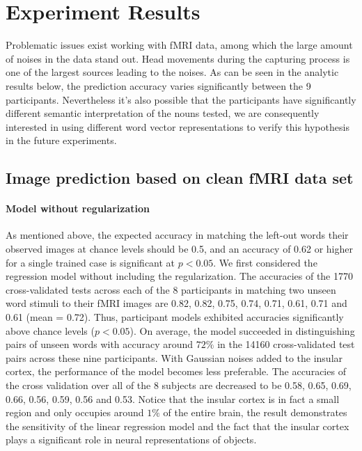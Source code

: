 \documentclass{article}
\begin{document}
\section{Experiment Results}
Problematic issues exist working with fMRI data, among which the large amount of noises in the data stand out. Head movements during the capturing process is one of the largest sources leading to the noises. As can be seen in the analytic results below, the prediction accuracy varies significantly between the 9 participants. Nevertheless it's also possible that the participants have significantly different semantic interpretation of the nouns tested, we are consequently interested in using different word vector representations to verify this hypothesis in the future experiments. 

\subsection{Image prediction based on clean fMRI data set}
\paragraph{Model without regularization}
As mentioned above, the expected accuracy in matching the left-out words their observed images at chance levels should be 0.5, and an accuracy of 0.62 or higher for a single trained case is significant at $p<0.05$. We first considered the regression model without including the regularization. The accuracies of the 1770 cross-validated tests across each of the 8 participants in matching two unseen word stimuli to their fMRI images are 0.82, 0.82, 0.75, 0.74, 0.71, 0.61, 0.71 and 0.61 (mean = 0.72). Thus,  participant models exhibited accuracies significantly above chance levels ($p<0.05$). On average, the model succeeded in distinguishing pairs of unseen words with accuracy around $72\%$ in the 14160 cross-validated test pairs across these nine participants. With Gaussian noises added to the insular cortex, the performance of the model becomes less preferable. The accuracies of the cross validation over all of the 8 subjects are decreased to be 0.58, 0.65, 0.69, 0.66, 0.56, 0.59, 0.56 and 0.53. Notice that the insular cortex is in fact a small region and only occupies around $1\%$ of the entire brain, the result demonstrates the sensitivity of the linear regression model and the fact that the insular cortex plays a significant role in neural representations of objects.
\end{document}
